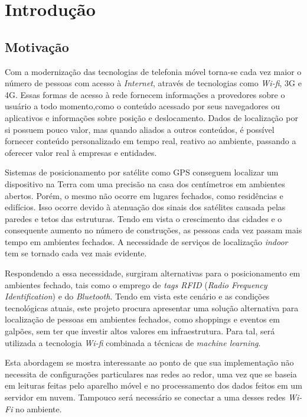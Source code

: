 \chapter{Introdução}\label{chp:introduction}

\section{Motivação}\label{sec:motivation}
Com a modernização das tecnologias de telefonia móvel torna-se cada vez maior o
número de pessoas com acesso à \textit{Internet}, através de tecnologias como \textit{Wi-fi},
3G e 4G. Essas formas de acesso à rede fornecem informações a provedores sobre o
usuário a todo momento,como o conteúdo acessado por seus navegadores ou aplicativos
e informações sobre posição e deslocamento. Dados de localização por si possuem
pouco valor, mas quando aliados a outros conteúdos, é possível fornecer conteúdo
personalizado em tempo real, reativo ao ambiente, passando a oferecer valor real
à empresas e entidades.
\par
Sistemas de posicionamento por satélite como GPS conseguem localizar um dispositivo
na Terra com uma precisão na casa dos centímetros em ambientes abertos. Porém,
o mesmo não ocorre em lugares fechados, como residências e edifícios. Isso ocorre
devido à atenuação dos sinais dos satélites causada pelas paredes e tetos das
estruturas. Tendo em vista o crescimento das cidades e o consequente aumento no
número de construções, as pessoas cada vez passam mais tempo em ambientes
fechados. A necessidade de serviços de localização \textit{indoor} tem se tornado cada
vez mais evidente.
\par
Respondendo a essa necessidade, surgiram alternativas para o posicionamento em
ambientes fechado, tais como o emprego de \textit{tags RFID} (\textit{Radio Frequency Identification}) e do \textit{Bluetooth}. Tendo em vista este
cenário e as condições tecnológicas atuais, este projeto procura apresentar uma
solução alternativa para localização de pessoas em ambientes fechados, como shoppings e
eventos em galpões, sem ter que investir altos valores em infraestrutura. Para tal, será utilizada a tecnologia \textit{Wi-fi} combinada a técnicas de \textit{machine learning}.
\par
Esta abordagem se mostra interessante ao ponto de que sua implementação não
necessita de configurações particulares nas redes ao redor, uma vez que se baseia
em leituras feitas pelo aparelho móvel e no processamento dos dados feitos em um
servidor em nuvem. Tampouco será necessário se conectar a uma desses redes
\textit{Wi-Fi} no ambiente.


